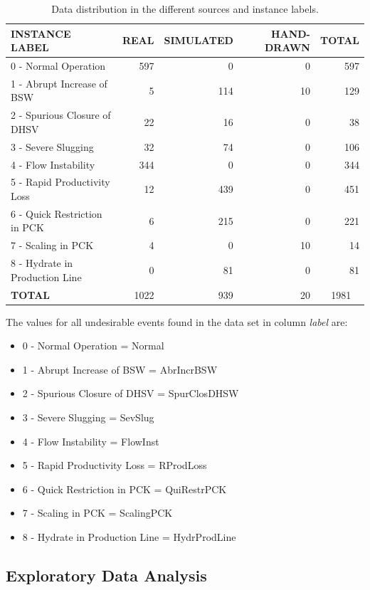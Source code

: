 \documentclass{article}
\begin{document}
\begin{table}[h]
\centering
\begin{tabular}{lrrr|r}

INSTANCE LABEL & REAL & SIMULATED & HAND-DRAWN & TOTAL \\ \hline
0 - Normal Operation & 597 & 0 & 0 & 597 \\
1 - Abrupt Increase of BSW & 5 & 114 & 10 & 129 \\
2 - Spurious Closure of DHSV & 22 & 16 & 0 & 38 \\
3 - Severe Slugging & 32 & 74 & 0 & 106 \\
4 - Flow Instability & 344 & 0 & 0 & 344 \\
5 - Rapid Productivity Loss & 12 & 439 & 0 & 451 \\
6 - Quick Restriction in PCK & 6 & 215 & 0 & 221 \\
7 - Scaling in PCK & 4 & 0 & 10 & 14 \\
8 - Hydrate in Production Line & 0 & 81 & 0 & 81 \\
\hline
\textbf{TOTAL} & 1022 & 939 & 20 & 1981 \
\end{tabular}
\caption{Data distribution in the different sources and instance labels.}
\label{tab:data_distribution}
\end{table}


The values for all undesirable events found in the data set in column \emph{label} are:

\begin{itemize}
\item 0 - Normal Operation = Normal
\item 1 - Abrupt Increase of BSW = AbrIncrBSW
\item 2 - Spurious Closure of DHSV = SpurClosDHSW
\item 3 - Severe Slugging = SevSlug
\item 4 - Flow Instability = FlowInst
\item 5 - Rapid Productivity Loss = RProdLoss
\item 6 - Quick Restriction in PCK = QuiRestrPCK
\item 7 - Scaling in PCK = ScalingPCK
\item 8 - Hydrate in Production Line = HydrProdLine
\end{itemize}

\subsection{Exploratory Data Analysis}
\end{document}
